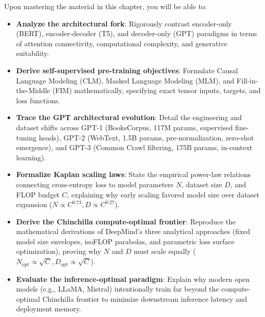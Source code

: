 \documentclass[../../main.tex]{subfiles}
\begin{document}
Upon mastering the material in this chapter, you will be able to:
\begin{itemize}
    \item \textbf{Analyze the architectural fork}: Rigorously contrast encoder-only (BERT), encoder-decoder (T5), and decoder-only (GPT) paradigms in terms of attention connectivity, computational complexity, and generative suitability.
    \item \textbf{Derive self-supervised pre-training objectives}: Formulate Causal Language Modeling (CLM), Masked Language Modeling (MLM), and Fill-in-the-Middle (FIM) mathematically, specifying exact tensor inputs, targets, and loss functions.
    \item \textbf{Trace the GPT architectural evolution}: Detail the engineering and dataset shifts across GPT-1 (BooksCorpus, 117M params, supervised fine-tuning heads), GPT-2 (WebText, 1.5B params, pre-normalization, zero-shot emergence), and GPT-3 (Common Crawl filtering, 175B params, in-context learning).
    \item \textbf{Formalize Kaplan scaling laws}: State the empirical power-law relations connecting cross-entropy loss to model parameters $N$, dataset size $D$, and FLOP budget $C$, explaining why early scaling favored model size over dataset expansion ($N \propto C^{0.73}, D \propto C^{0.27}$).
    \item \textbf{Derive the Chinchilla compute-optimal frontier}: Reproduce the mathematical derivations of DeepMind's three analytical approaches (fixed model size envelopes, isoFLOP parabolas, and parametric loss surface optimization), proving why $N$ and $D$ must scale equally ($N_{\text{opt}} \propto \sqrt{C}, D_{\text{opt}} \propto \sqrt{C}$).
    \item \textbf{Evaluate the inference-optimal paradigm}: Explain why modern open models (e.g., LLaMA, Mistral) intentionally train far beyond the compute-optimal Chinchilla frontier to minimize downstream inference latency and deployment memory.
\end{itemize}
\end{document}
